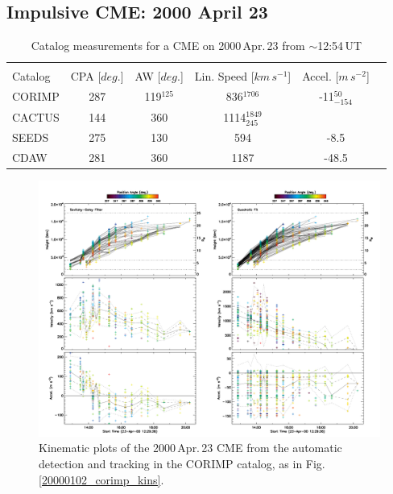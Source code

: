 \documentclass[referee,a4paper,12pt,traditabstract]{swsc}
\begin{document}
\begin{linenumbers}
\subsection{Impulsive CME: 2000 April 23}


\begin{table}[h]
\begin{tabular}{l*{4}{c}r}
\multicolumn{5}{c}{} \\
Catalog              & CPA [$deg.$] & AW [$deg.$] & Lin. Speed [$km\,s^{-1}$] & Accel. [$m\,s^{-2}$]  \\
\hline
CORIMP   & 287 & 119$^{125}$ & 836$^{1706}$ & -11$_{-154}^{50}$       \\
CACTUS  & 144 & 360 & 1114$_{245}^{1849}$ &            \\
SEEDS  & 275 & 130 & 594 & -8.5        \\
CDAW      & 281 & 360 & 1187 & -48.5 \\
\end{tabular}
\caption{Catalog measurements for a CME on 2000\,Apr.\,23 from $\sim$12:54\,UT}
\label{table_20000423}
\end{table}

\begin{figure}[t]
\centerline{\includegraphics[width=\linewidth]{images/20000423_corimp_kins.pdf}}
\caption{Kinematic plots of the 2000\,Apr.\,23 CME from the automatic detection and tracking in the CORIMP catalog, as in Fig.\,\ref{20000102_corimp_kins}.}
\label{20000423_corimp_kins}
\end{figure}



\end{linenumbers}
\end{document}
